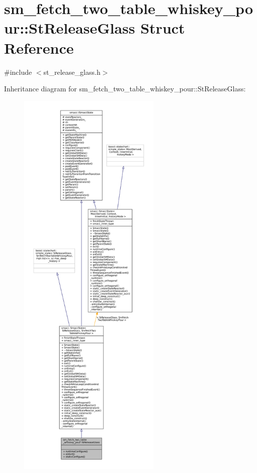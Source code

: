 \hypertarget{structsm__fetch__two__table__whiskey__pour_1_1StReleaseGlass}{}\section{sm\+\_\+fetch\+\_\+two\+\_\+table\+\_\+whiskey\+\_\+pour\+:\+:St\+Release\+Glass Struct Reference}
\label{structsm__fetch__two__table__whiskey__pour_1_1StReleaseGlass}


{\ttfamily \#include $<$st\+\_\+release\+\_\+glass.\+h$>$}



Inheritance diagram for sm\+\_\+fetch\+\_\+two\+\_\+table\+\_\+whiskey\+\_\+pour\+:\+:St\+Release\+Glass\+:
\nopagebreak
\begin{figure}[H]
\begin{center}
\leavevmode
\includegraphics[height=550pt]{structsm__fetch__two__table__whiskey__pour_1_1StReleaseGlass__inherit__graph}
\end{center}
\end{figure}



